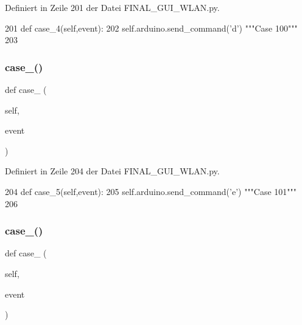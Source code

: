 Definiert in Zeile 201 der Datei F\+I\+N\+A\+L\+\_\+\+G\+U\+I\+\_\+\+W\+L\+A\+N.\+py.


\begin{DoxyCode}
201     \textcolor{keyword}{def }case\_4(self,event):
202         self.arduino.send\_command(\textcolor{stringliteral}{'d'})  \textcolor{stringliteral}{"""Case 100"""}
203 
\end{DoxyCode}
\mbox{\label{class_f_i_n_a_l___g_u_i___w_l_a_n_1_1_w_l_a_n_aabab537872285d8e714e0eee4910b172}} 
\subsubsection{\texorpdfstring{case\+\_()}{case\_5()}}
{\footnotesize\ttfamily def case\+\_ (\begin{DoxyParamCaption}\item[{}]{self,  }\item[{}]{event }\end{DoxyParamCaption})}



Definiert in Zeile 204 der Datei F\+I\+N\+A\+L\+\_\+\+G\+U\+I\+\_\+\+W\+L\+A\+N.\+py.


\begin{DoxyCode}
204     \textcolor{keyword}{def }case\_5(self,event):
205         self.arduino.send\_command(\textcolor{stringliteral}{'e'})  \textcolor{stringliteral}{"""Case 101"""}
206 
\end{DoxyCode}
\mbox{\label{class_f_i_n_a_l___g_u_i___w_l_a_n_1_1_w_l_a_n_a03bf56233c58c2e78e884a5ef7d5c7e2}} 
\subsubsection{\texorpdfstring{case\+\_()}{case\_6()}}
{\footnotesize\ttfamily def case\+\_ (\begin{DoxyParamCaption}\item[{}]{self,  }\item[{}]{event }\end{DoxyParamCaption})}



